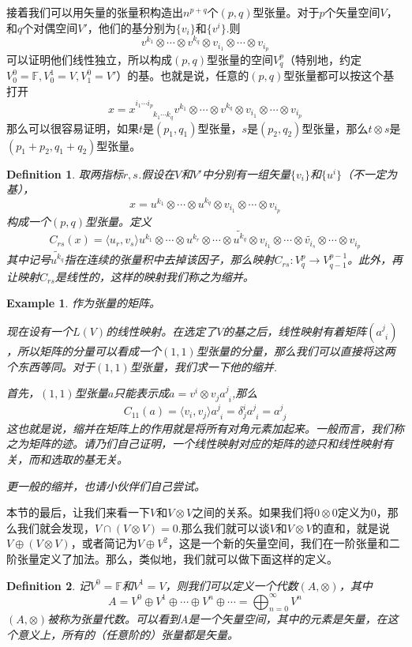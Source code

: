 \documentclass[11pt,a4paper,openany]{book}%
\theoremstyle{plain}%
\newtheorem{defi}{Definition}[chapter]%
\newtheorem{exa}{Example}[chapter]%
\begin{document}
接着我们可以用矢量的张量积构造出$n^{p+q}$个$(p,q)$型张量。对于$p$个矢量空间$V$，和$q$个对偶空间$V'$，他们的基分别为$\{v_i\}$和$\{v^i\}$.则
\[
v^{k_1}\otimes\cdots\otimes v^{k_q}\otimes v_{i_1}\otimes\cdots\otimes v_{i_p}
\]
可以证明他们线性独立，所以构成$(p,q)$型张量的空间$V^p_q$（特别地，约定$V^0_0=\mathbb{F},V^1_0=V,V^0_1=V'$）的基。也就是说，任意的$(p,q)$型张量都可以按这个基打开
\[
x=x^{i_1\cdots i_p}_{\phantom{i_1\cdots i_p}k_1\cdots k_q}v^{k_1}\otimes\cdots\otimes v^{k_q}\otimes v_{i_1}\otimes\cdots\otimes v_{i_p}
\]
那么可以很容易证明，如果$t$是$(p_1,q_1)$型张量，$s$是$(p_2,q_2)$型张量，那么$t\otimes s$是$(p_1+p_2,q_1+q_2)$型张量。
\begin{defi}
取两指标$r,s$.假设在$V$和$V'$中分别有一组矢量$\{v_i\}$和$\{u^i\}$（不一定为基），
\[
x=u^{k_1}\otimes\cdots\otimes u^{k_q}\otimes v_{i_1}\otimes\cdots\otimes v_{i_p}
\]
构成一个$(p,q)$型张量。定义
\[
C_{rs}(x)=\langle u_r,v_s \rangle u^{k_1}\otimes\cdots\otimes u^{k_r}\otimes\cdots\otimes \widetilde{u^{k_q}}\otimes v_{i_1}\otimes\cdots\otimes \widetilde{v_{i_s}}\otimes\cdots\otimes v_{i_p}
\]
其中记号$\widetilde{u^{k_q}}$指在连续的张量积中去掉该因子，那么映射$C_{rs}:V^p_q\rightarrow V^{p-1}_{q-1}$。此外，再让映射$C_{rs}$是线性的，这样的映射我们称之为缩并。
\end{defi}
\begin{exa}
作为张量的矩阵。

现在设有一个$L(V)$的线性映射。在选定了$V$的基之后，线性映射有着矩阵$(a^j_{\phantom{j}i})$，所以矩阵的分量可以看成一个$(1,1)$型张量的分量，那么我们可以直接将这两个东西等同。对于$(1,1)$型张量，我们求一下他的缩并.

首先，$(1,1)$型张量$a$只能表示成$a=v^i\otimes v_j a^j_{\phantom{j}i}$,那么
\[
C_{11}(a)=\langle v_i,v_j\rangle a^j_{\phantom{j}i}=\delta_{j}^i a^j_{\phantom{j}i}=a^j_{\phantom{j}j}
\]
这也就是说，缩并在矩阵上的作用就是将所有对角元素加起来。一般而言，我们称之为矩阵的{\kaishu 迹}。请乃们自己证明，一个线性映射对应的矩阵的迹只和线性映射有关，而和选取的基无关。

更一般的缩并，也请小伙伴们自己尝试。
\end{exa}
本节的最后，让我们来看一下$V$和$V\otimes V$之间的关系。如果我们将$0 \otimes 0$定义为$0$，那么我们就会发现，$V\cap (V\otimes V)=0$.那么我们就可以谈$V$和$V\otimes V$的直和，就是说$V\oplus (V\otimes V)$，或者简记为$V\oplus V^2$，这是一个新的矢量空间，我们在一阶张量和二阶张量定义了加法。那么，类似地，我们就可以做下面这样的定义。
\begin{defi}
记$V^0=\mathbb{F}$和$V^1=V$，则我们可以定义一个代数$(A,\otimes)$，其中
\[
A=V^0\oplus V^1\oplus \cdots \oplus V^n \oplus \cdots=\bigoplus_{n=0}^\infty V^n
\]
$(A,\otimes)$被称为张量代数。可以看到A是一个矢量空间，其中的元素是矢量，在这个意义上，所有的（任意阶的）张量都是矢量。
\end{defi}
\end{document}

